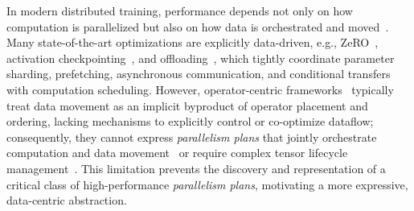 \documentclass[letterpaper,twocolumn,10pt]{article}
\begin{document}
In modern distributed training, performance depends not only on how computation is parallelized but also on how data is orchestrated and moved~\cite{huang2019yugong, qiu2025moirai, zhu2025mist, kim2023bpipe, lin2025weipipe, xu2021gspmd}. Many state-of-the-art optimizations are explicitly data-driven, e.g., ZeRO~\cite{rajbhandari2020zero, zhao2023pytorch}, activation checkpointing~\cite{chen2016training}, and offloading~\cite{ren2021zero}, which tightly coordinate parameter sharding, prefetching, asynchronous communication, and conditional transfers with computation scheduling. However, operator-centric frameworks~\cite{lin2024nnscaler, lin2024tessel} typically treat data movement as an implicit byproduct of operator placement and ordering, lacking mechanisms to explicitly control or co-optimize dataflow; consequently, they cannot express \textit{parallelism plans} that jointly orchestrate computation and data movement~\cite{zhuang2023optimizing} or require complex tensor lifecycle management~\cite{kim2023bpipe, lin2025weipipe}. This limitation prevents the discovery and representation of a critical class of high-performance \textit{parallelism plans}, motivating a more expressive, data-centric abstraction.



\end{document}
